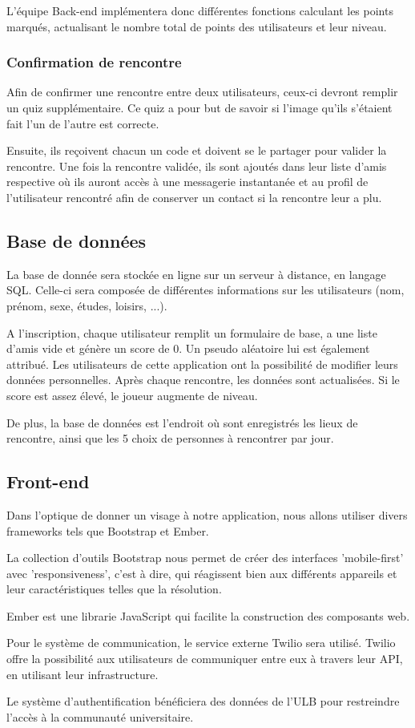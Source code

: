 \documentclass[10pt]{article}
\begin{document}
    L'équipe Back-end implémentera donc différentes fonctions calculant les points marqués, actualisant le nombre total de points des
    utilisateurs et leur niveau.
   \subsubsection{Confirmation de rencontre}
    Afin de confirmer une rencontre entre deux utilisateurs, ceux-ci devront remplir un quiz supplémentaire.
    Ce quiz a pour but de savoir si l'image qu'ils s'étaient fait l'un de l'autre est correcte.

    Ensuite, ils reçoivent chacun un code et doivent se le partager pour valider la rencontre.
    Une fois la rencontre validée, ils sont ajoutés dans leur liste d'amis respective où ils auront accès à une messagerie
    instantanée et au profil de l'utilisateur rencontré afin de conserver un contact si la rencontre leur a plu.

  \subsection{Base de données}
   La base de donnée sera stockée en ligne sur un serveur à distance, en langage SQL.
   Celle-ci sera composée de différentes informations sur les utilisateurs (nom, prénom, sexe, études, loisirs, ...).

   A l'inscription, chaque utilisateur remplit un formulaire de base, a une liste d'amis vide et génère un score de 0.
   Un pseudo aléatoire lui est également attribué. Les utilisateurs de cette application ont la possibilité de modifier leurs données personnelles.
   Après chaque rencontre, les données sont actualisées. Si le score est assez élevé, le joueur augmente de niveau.

   De plus, la base de données est l'endroit où sont enregistrés les lieux de rencontre, ainsi que les 5 choix de personnes à rencontrer par jour.

  \subsection{Front-end}
   Dans l'optique de donner un visage à notre application, nous allons utiliser divers frameworks tels que Bootstrap et Ember.

   La collection d'outils Bootstrap nous permet de créer des interfaces 'mobile-first' avec 'responsiveness', c'est à dire, qui réagissent bien
   aux différents appareils et leur caractéristiques telles que la résolution.

   Ember est une librarie JavaScript qui facilite la construction des composants web.

   Pour le système de communication, le service externe Twilio sera utilisé. Twilio offre la possibilité aux utilisateurs de communiquer
   entre eux à travers leur API, en utilisant leur infrastructure.

   Le système d'authentification bénéficiera des données de l'ULB pour restreindre l'accès à la communauté universitaire.
\end{document}
